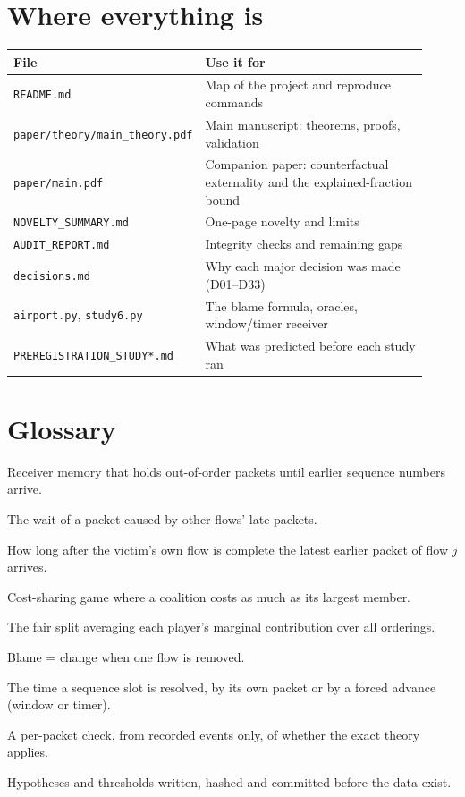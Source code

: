 \documentclass[11pt]{article}
\begin{document}
\section{Where everything is}
\begin{center}\small
\begin{tabular}{p{0.38\linewidth}p{0.54\linewidth}}
\toprule
File & Use it for\\
\midrule
\texttt{README.md} & Map of the project and reproduce commands\\
\texttt{paper/theory/main\_theory.pdf} & Main manuscript: theorems, proofs, validation\\
\texttt{paper/main.pdf} & Companion paper: counterfactual externality and the explained-fraction bound\\
\texttt{NOVELTY\_SUMMARY.md} & One-page novelty and limits\\
\texttt{AUDIT\_REPORT.md} & Integrity checks and remaining gaps\\
\texttt{decisions.md} & Why each major decision was made (D01--D33)\\
\texttt{airport.py}, \texttt{study6.py} & The blame formula, oracles, window/timer receiver\\
\texttt{PREREGISTRATION\_STUDY*.md} & What was predicted before each study ran\\
\bottomrule
\end{tabular}
\end{center}

\section{Glossary}
\begin{description}[leftmargin=0pt,style=nextline]
\item[Reorder buffer] Receiver memory that holds out-of-order packets until earlier sequence numbers arrive.
\item[Cross-flow blocking] The wait of a packet caused by other flows' late packets.
\item[Lateness $\ell_j$] How long after the victim's own flow is complete the latest earlier packet of flow $j$ arrives.
\item[Airport game] Cost-sharing game where a coalition costs as much as its largest member.
\item[Shapley value] The fair split averaging each player's marginal contribution over all orderings.
\item[Leave-one-out] Blame = change when one flow is removed.
\item[Effective arrival] The time a sequence slot is resolved, by its own packet or by a forced advance (window or timer).
\item[Certificate] A per-packet check, from recorded events only, of whether the exact theory applies.
\item[Preregistration] Hypotheses and thresholds written, hashed and committed before the data exist.
\end{description}
\end{document}
